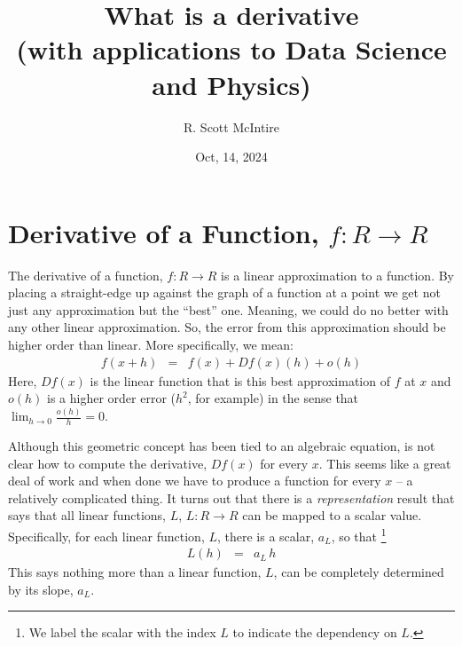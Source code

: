 \documentclass{article}
\title{What is a derivative \\ (with applications to Data Science and Physics)}
\author{R. Scott McIntire}
\date{Oct, 14, 2024}
\begin{document}
\maketitle

\section{Derivative of a Function, $f: R\rightarrow R$}
The derivative of a function, $f : R \rightarrow R$ is a linear approximation to
a function. By placing a straight-edge up against the graph of a function at
a point we get not just any approximation but the ``best''{} one. Meaning,
we could do no better with any other linear approximation. So, the error
from this approximation should be higher order than linear. More specifically,
we mean:
\begin{eqnarray}
f(x + h) & = & f(x) + Df(x)(h) + o(h) \label{simderdef}
\end{eqnarray}
Here, $Df(x)$ is the linear function that is this best approximation of $f$ at $x$
and $o(h)$ is a higher order error ($h^2$, for example) in the sense that
$\lim_{h\rightarrow 0} \frac{o(h)}{h} = 0$.

Although this geometric concept has been tied to an algebraic equation,
is not clear how to compute the derivative, $Df(x)$ for every $x$. This seems
like a great deal of work and when done we have to produce a function for
every $x$ -- a relatively complicated thing. It turns out that there is a
{\em representation\/} result	 that says that all linear functions, $L$,
$L: R \rightarrow R$ can be mapped to a scalar value.
Specifically, for each linear function, $L$, there is a scalar, $a_L$, so that%
\footnote{We label the scalar with the index $L$ to indicate the dependency on $L$.}
\begin{eqnarray}
  L(h) & = & a_L \, h
\end{eqnarray}
This says nothing more than a linear function, $L$, can be completely determined
by its slope, $a_L$.
\end{document}
